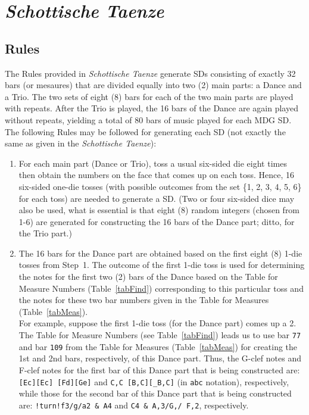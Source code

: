 \documentclass[a4paper,x11names,svgnames,10pt]{article}
\begin{document}
{\section{\em Schottische Taenze}

\subsection{Rules}\label{mdgRules}

The Rules provided in {\em Schottische Taenze} generate SDs consisting of exactly 32 bars (or mesaures) that are divided equally into two (2) main parts: a Dance and a Trio.  The two sets of eight (8) bars for each of the two main parts are played with repeats.  After the Trio is played, the 16 bars of the Dance are again played without repeats, yielding a total of 80 bars of music played for each MDG SD. \\

The following Rules may be followed for generating each SD (not exactly the same as given in the {\it Schottische Taenze}):

\begin{enumerate}
	\item [1.] For each main part (Dance or Trio), toss a usual six-sided die eight times then obtain the numbers on the face that comes up on each toss.  Hence, 16 six-sided one-die tosses (with possible outcomes from the set \{1, 2, 3, 4, 5, 6\} for each toss) are needed to generate a SD. (Two or four six-sided dice may also be used, what is essential is that eight (8) random integers (chosen from 1-6) are generated for constructing the 16 bars of the Dance part; ditto, for the Trio part.)
	\item [2.\label{step2}] The 16 bars for the Dance part are obtained based on the first eight (8) 1-die tosses from Step~1.  The outcome of the first 1-die toss is used for determining the notes for the first two (2) bars of the Dance based on the Table for Measure Numbers (Table~\ref{tabFind}) corresponding to this particular toss and the notes for these two bar numbers given in the Table for Measures (Table~\ref{tabMeas}).\\
	For example, suppose the first 1-die toss (for the Dance part) comes up a 2. The Table for Measure Numbers (see Table~\ref{tabFind}) leads us to use bar {\tt 77} and bar {\tt 109} from the Table for Measures (Table~\ref{tabMeas}) for creating the 1st and 2nd bars, respectively, of this Dance part.  Thus, the G-clef notes and F-clef notes for the first bar of this Dance part that is being constructed are: {\tt [Ec][Ec] [Fd][Ge]} and {\tt C,C [B,C][\_B,C]} (in {\tt abc} notation), respectively, while those for the second bar of this Dance part that is being constructed are: {\tt !turn!f3/g/a2 \& A4} and {\tt C4 \& A,3/G,/ F,2}, respectively. 


\end{enumerate}}
\end{document}
